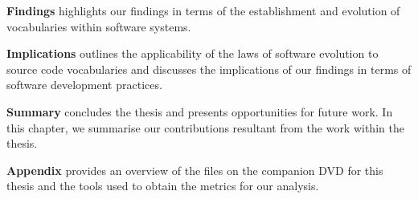 \textbf{Findings} highlights our findings in terms of the establishment and evolution of vocabularies within software systems.

\textbf{Implications} outlines the applicability of the laws of software evolution to source code vocabularies and discusses the implications of our findings in terms of software development practices.

\textbf{Summary} concludes the thesis and presents opportunities for future work. In this chapter, we summarise our contributions resultant from the work within the thesis.

\textbf{Appendix} provides an overview of the files on the companion DVD for this thesis and the tools used to obtain the metrics for our analysis.

